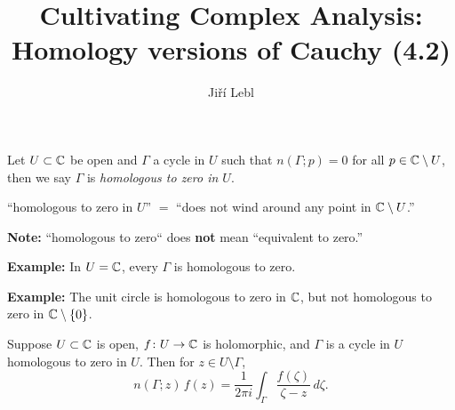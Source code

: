 \documentclass[10pt,aspectratio=169]{beamer}
\author{Ji\v{r}\'i Lebl}
\institute[OSU]{%
Departemento pri Matematiko de Oklahoma {\^S}tata Universitato}
\title{Cultivating Complex Analysis:\\%
Homology versions of Cauchy (4.2)}
\date{}
\begin{document}
\begin{frame}
\titlepage
\end{frame}

\begin{frame}
\begin{definition}
Let $U \subset {\mathbb{C}}$ be open and $\Gamma$
a cycle
in $U$
such that $n(\Gamma;p) = 0$ for all $p \in {\mathbb{C}} \setminus U$,
 then we
say $\Gamma$ is \emph{homologous to zero in $U$}.
\end{definition}

\pause

``homologous to zero in $U$'' $=$ ``does not wind around any point in ${\mathbb{C}}
\setminus U$.''

\medskip
\pause

\textbf{Note:} ``homologous to zero`` does \textbf{not} mean ``equivalent to
zero.''

\medskip
\pause

\textbf{Example:}
In $U = {\mathbb{C}}$, every $\Gamma$ is homologous to zero.

\medskip
\pause

\textbf{Example:}
The unit circle is homologous to zero in ${\mathbb{C}}$, but not homologous to
zero in ${\mathbb{C}} \setminus \{ 0 \}$.

\pause

\begin{theorem}
Suppose $U \subset {\mathbb{C}}$ is open, $f \colon U \to {\mathbb{C}}$ is holomorphic, and
$\Gamma$ is
a cycle
in $U$
homologous to zero in $U$.
Then for $z \in U \setminus \Gamma$,
\begin{equation*}
n(\Gamma;z)
\,
f(z)
=
\frac{1}{2\pi i}
\int_{\Gamma}
\frac{f(\zeta)}{\zeta-z}
\,
d \zeta .
\end{equation*}
\end{theorem}

\end{frame}
\end{document}
